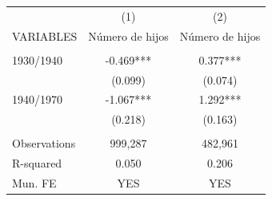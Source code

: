 \begin{tabular}{lcc} \hline
 & (1) & (2) \\
VARIABLES & Número de hijos & Número de hijos \\ \hline
 &  &  \\
1930/1940 & -0.469*** & 0.377*** \\
 & (0.099) & (0.074) \\
1940/1970 & -1.067*** & 1.292*** \\
 & (0.218) & (0.163) \\
 &  &  \\
Observations & 999,287 & 482,961 \\
R-squared & 0.050 & 0.206 \\
 Mun. FE & YES & YES \\ \hline
\end{tabular}
